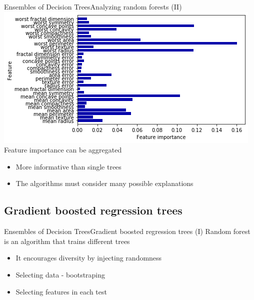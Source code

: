 \documentclass[10pt,compress]{beamer} %
\begin{document}
\begin{frame}{Ensembles of Decision Trees}{Analyzing random forests (II)}
    \centering \includegraphics[width=0.8\linewidth]{figs/forest-importance.png}\\
    \vspace{-0.2cm}
    \flushleft Feature importance can be aggregated
    \begin{itemize}
        \item More informative than single trees
        \item The algorithms must consider many possible explanations
    \end{itemize}
\end{frame}

\subsection{Gradient boosted regression trees}

\begin{frame}{Ensembles of Decision Trees}{Gradient boosted regression trees (I)}
    \alert{Random forest} is an algorithm that trains different trees
    \begin{itemize}
        \item It encourages diversity by injecting randomness
        \item Selecting data - bootstraping
        \item Selecting features in each test
    \end{itemize}
\end{frame}
\end{document}
